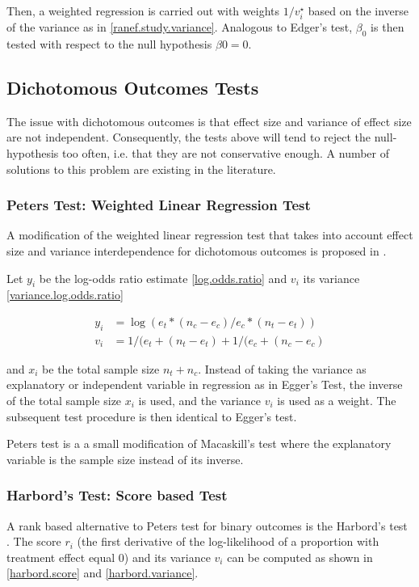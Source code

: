 \documentclass[11pt,a4paper,twoside]{book}\usepackage[]{graphicx}\usepackage[]{color}
\begin{document}
Then, a weighted regression is carried out with weights $1/v_{i}^\star$ based on the inverse of the variance as in \ref{ranef.study.variance}. Analogous to Edger's test, $\beta_{0}$ is then tested with respect to the null hypothesis $\beta{0} = 0$.

\subsection{Dichotomous Outcomes Tests}

The issue with dichotomous outcomes is that effect size and variance of effect size are not independent. Consequently, the tests above will tend to reject the null-hypothesis too often, i.e. that they are not conservative enough. A number of solutions to this problem are existing in the literature.


\subsubsection{Peters Test: Weighted Linear Regression Test}
A modification of the weighted linear regression test that takes into account effect size and variance interdependence for dichotomous outcomes is proposed in \citet{Peters}.

\vspace{0mm}
Let $y_i$ be the log-odds ratio estimate \ref{log.odds.ratio} and $v_{i}$ its variance \ref{variance.log.odds.ratio}

\begin{align}
y_{i} &= \log(e_{t}*(n_{c} - e_{c})/e_{c}*(n_{t} - e_{t})) \label{log.odds.ratio}\\
v_{i} &= 1/(e_{t}+(n_{t} - e_{t}) + 1/(e_{c}+(n_{c} - e_{c}) \label{variance.log.odds.ratio}
\end{align}

and $x_{i}$ be the total sample size $n_{t} + n_{c}$. Instead of taking the variance as explanatory or independent variable in regression as in Egger's Test, the inverse of the total sample size $x_{i}$ is used, and the variance $v_{i}$ is used as a weight. The subsequent test procedure is then identical to Egger's test. 

\vspace{0mm}
Peters test is a a small modification of Macaskill's test where the explanatory variable is the sample size instead of its inverse.


\subsubsection{Harbord's Test: Score based Test}
A rank based alternative to Peters test for binary outcomes is the Harbord's test \citep{Harbord}. The score $r_{i}$ (the first derivative of the log-likelihood of a proportion with treatment effect equal 0) and its variance $v_{i}$ can be computed as shown in \ref{harbord.score} and \ref{harbord.variance}.
\end{document}
